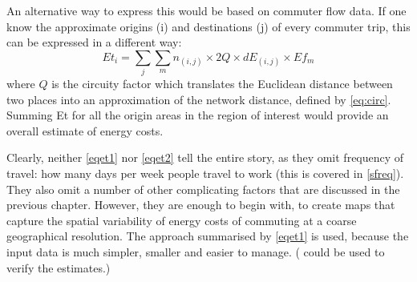 An alternative way to express this would be based on commuter flow data.
If one know the approximate origins (i) and destinations (j) of every commuter
trip, this can be expressed in a different way:
\begin{equation}
 Et_i = \sum_j \sum_m {n_{(i,j)} \times 2Q \times dE_{(i,j)} \times Ef_m}
 \label{eqet2}
\end{equation}
where $Q$ is the circuity factor which translates the Euclidean distance between
two places into an approximation of the network distance, defined by \cref{eq:circ}.
Summing Et for all the origin areas in the region of interest would provide
an overall estimate of energy costs.

Clearly, neither \cref{eqet1} nor \cref{eqet2}
tell the entire story, as they omit frequency of travel: how many days
per week people travel to work (this is covered in \cref{sfreq}).
They also omit a number of other complicating factors that are discussed in
the previous chapter.  However, they are enough to begin with, to create maps
that capture the spatial variability of energy costs of commuting at
a coarse geographical resolution.
The approach summarised by \cref{eqet1} is used, because the input data
is much simpler, smaller and easier to manage. ( could be used
to verify the estimates.)

